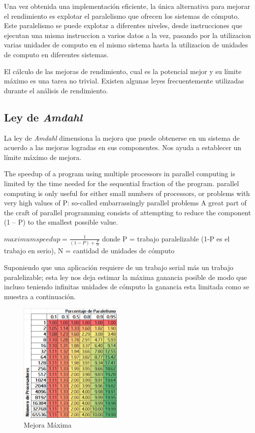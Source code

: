 \documentclass[a4paper]{report}
\begin{document}
Una vez obtenida una implementaci\'on eficiente, la \'unica alternativa para mejorar el rendimiento es explotar el paralelismo que
ofrecen los sistemas de c\'omputo. Este paralelismo se puede explotar a diferentes niveles, desde instrucciones que ejecutan una misma instruccion a varios
datos a la vez, pasando por la utilizacion varias unidades de computo en el mismo sistema hasta la utilizacion de unidades de computo en diferentes sistemas.

\bigskip

El c\'alculo de las mejoras de rendimiento, cual es la potencial mejor y su l\'imite m\'aximo es una tarea no trivial.
Existen algunas leyes frecuentemente utilizadas durante el an\'alisis de rendimiento.

\subsection{Ley de {\it Amdahl}}

 La ley de {\it Amdahl} \cite{amdahl} dimensiona la mejora que puede obtenerse en un sistema de acuerdo a las mejoras logradas en sus
componentes. Nos ayuda a establecer un l\'imite m\'aximo de mejora.

The speedup of a program using multiple processors in parallel computing is limited by the time needed for the sequential fraction of the program.
 parallel computing is only useful for either small numbers of processors, or problems with very high values of P: so-called embarrassingly parallel problems
 A great part of the craft of parallel programming consists of attempting to reduce the component (1 – P) to the smallest possible value.

\bigskip

$ maximum speed up = \frac{1}{(1-P) + \frac{P}{N}} $ donde P = trabajo paralelizable (1-P es el trabajo en serio), N = cantidad de unidades de c\'omputo

\bigskip

Suponiendo que una aplicaci\'on requiere de un trabajo serial más un trabajo paralelizable; esta ley nos deja estimar la m\'axima ganancia posible
de modo que incluso teniendo infinitas unidades de c\'omputo la ganancia esta limitada como se muestra a continuaci\'on.

\begin{figure}[H]
\begin{center}
\includegraphics[width=5cm]{amdahl.png}
\caption{Mejora M\'axima}
\end{center}
\end{figure}
\end{document}
